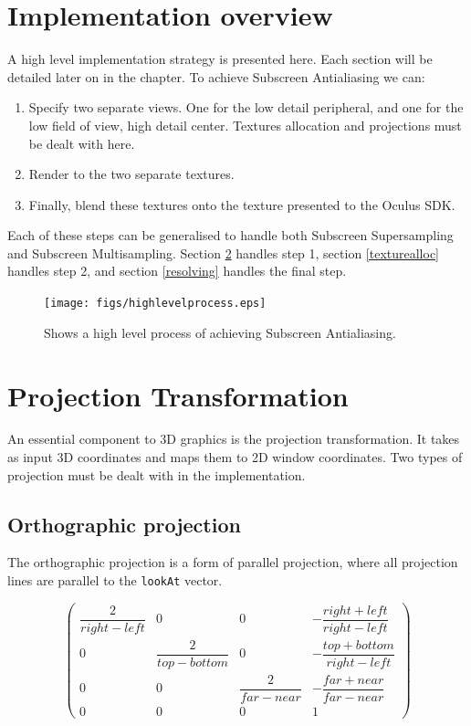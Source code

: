 \documentclass[12pt,a4paper,twoside,openright]{report}
\begin{document}
\section{Implementation overview} 

A high level implementation strategy is presented here. Each section will be detailed later on in the chapter.
To achieve Subscreen Antialiasing we can:

\begin{enumerate}
\item Specify two separate views. One for the low detail peripheral, and one for the low field of view, high detail center. Textures allocation and projections must be dealt with here.
\item Render to the two separate textures.
\item Finally, blend these textures onto the texture presented to the Oculus SDK. 
\end{enumerate}

Each of these steps can be generalised to handle both Subscreen Supersampling and Subscreen Multisampling. Section \ref{projections} handles step 1, section \ref{texturealloc} handles step 2, and section \ref{resolving} handles the final step.

\begin{figure}[tbh]
\begin{center}
\texttt{[image: figs/highlevelprocess.eps]}
\caption{Shows a high level process of achieving Subscreen Antialiasing.}
\label{fig:meshgrid}
\end{center}
\end{figure}

\section{Projection Transformation} \label{projections}

An essential component to 3D graphics is the projection transformation. It takes as input 3D coordinates and maps them to 2D window coordinates.
Two types of projection must be dealt with in the implementation. 

\subsection{Orthographic projection}
The orthographic projection is a form of parallel projection, where all projection lines are parallel to the \texttt{lookAt} vector. 

\[
\begin{pmatrix}
\dfrac{2}{right-left} & 0 & 0 & -\dfrac{right+left}{right-left} \\
0 & \dfrac{2}{top-bottom} & 0 & -\dfrac{top+bottom}{right-left} \\
0 & 0 & \dfrac{2}{far-near} & -\dfrac{far + near}{far-near} \\
0 & 0 & 0 & 1
\end{pmatrix}
\]
\end{document}
